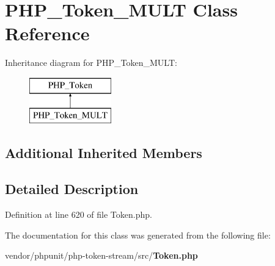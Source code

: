 \section{P\+H\+P\+\_\+\+Token\+\_\+\+M\+U\+L\+T Class Reference}
\label{class_p_h_p___token___m_u_l_t}
Inheritance diagram for P\+H\+P\+\_\+\+Token\+\_\+\+M\+U\+L\+T\+:\begin{figure}[H]
\begin{center}
\leavevmode
\includegraphics[height=2.000000cm]{class_p_h_p___token___m_u_l_t}
\end{center}
\end{figure}
\subsection*{Additional Inherited Members}


\subsection{Detailed Description}


Definition at line 620 of file Token.\+php.



The documentation for this class was generated from the following file\+:\begin{DoxyCompactItemize}
\item 
vendor/phpunit/php-\/token-\/stream/src/{\bf Token.\+php}\end{DoxyCompactItemize}
